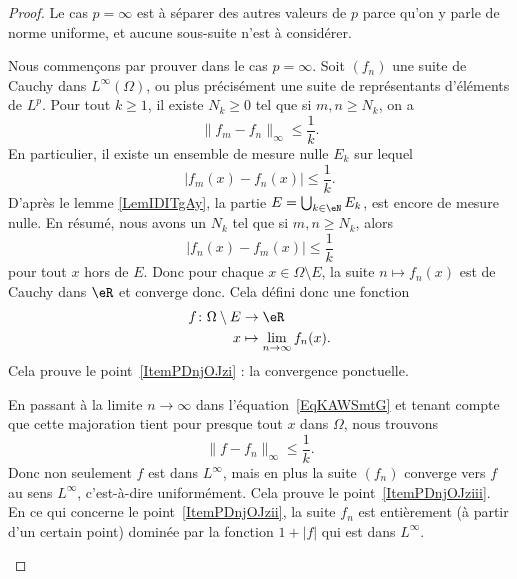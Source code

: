 \begin{proof}
	Le cas \( p=\infty\) est à séparer des autres valeurs de \( p\) parce qu'on y parle de norme uniforme, et aucune sous-suite n'est à considérer.
	\begin{subproof}
		\spitem[Cas \( p=\infty\).]
		Nous commençons par prouver dans le cas \( p=\infty\). Soit \( (f_n)\) une suite de Cauchy dans \( L^{\infty}(\Omega)\), ou plus précisément une suite de représentants d'éléments de \( L^p\). Pour tout \( k\geq 1\), il existe \( N_k\geq 0\) tel que si \( m,n\geq N_k\), on a
		\begin{equation}
			\| f_m-f_n \|_{\infty}\leq \frac{1}{ k }.
		\end{equation}
		En particulier, il existe un ensemble de mesure nulle \( E_k\) sur lequel
		\begin{equation}
			| f_m(x)-f_n(x) |\leq\frac{1}{ k }.
		\end{equation}
		D'après le lemme \ref{LemIDITgAy}, la partie \( E=\bigcup_{k\in \eN}E_k\), est encore de mesure nulle. En  résumé, nous avons un \( N_k\) tel que si \( m,n\geq N_k\), alors
		\begin{equation}    \label{EqKAWSmtG}
			| f_n(x)-f_m(x) |\leq \frac{1}{ k }
		\end{equation}
		pour tout \( x\) hors de \( E\). Donc pour chaque \( x\in\Omega\setminus E\), la suite \( n\mapsto f_n(x)\) est de Cauchy dans \( \eR\) et converge donc. Cela défini donc une fonction
		\begin{equation}
			\begin{aligned}
				f\colon \Omega\setminus E & \to \eR                            \\
				x                         & \mapsto \lim_{n\to \infty} f_n(x).
			\end{aligned}
		\end{equation}
		Cela prouve le point~\ref{ItemPDnjOJzi} : la convergence ponctuelle.

		En passant à la limite \( n\to \infty\) dans l'équation~\eqref{EqKAWSmtG} et tenant compte que cette majoration tient pour presque tout \( x\) dans \( \Omega\), nous trouvons
		\begin{equation}
			\| f-f_n \|_{\infty}\leq \frac{1}{ k }.
		\end{equation}
		Donc non seulement \( f\) est dans \( L^{\infty}\), mais en plus la suite \( (f_n)\) converge vers \( f\) au sens \( L^{\infty}\), c'est-à-dire uniformément. Cela prouve le point~\ref{ItemPDnjOJziii}. En ce qui concerne le point~\ref{ItemPDnjOJzii}, la suite \( f_n\) est entièrement (à partir d'un certain point) dominée par la fonction \( 1+| f |\) qui est dans \( L^{\infty}\).


\end{subproof}
\end{proof}
